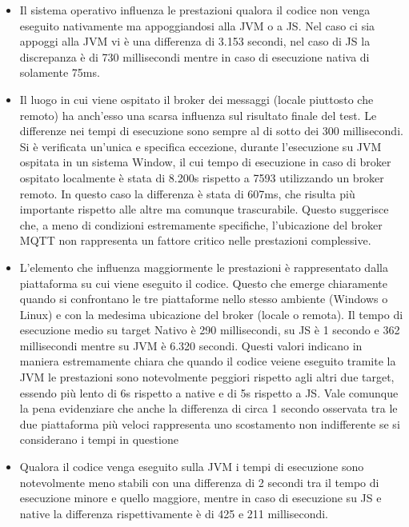 \documentclass[12pt,a4paper,openright,twoside]{book}
\begin{document}
\begin{itemize}
    \item Il sistema operativo influenza le prestazioni qualora il codice non venga eseguito nativamente ma appoggiandosi alla \ac{JVM} o a \ac{JS}. 
    Nel caso ci sia appoggi alla \ac{JVM} vi è una differenza di 3.153 secondi, nel caso di \ac{JS} la discrepanza è di 730 millisecondi 
    mentre in caso di esecuzione nativa di solamente 75ms.

    \item Il luogo in cui viene ospitato il broker dei messaggi (locale piuttosto che remoto) ha anch’esso una scarsa influenza sul risultato finale del test. 
    Le differenze nei tempi di esecuzione sono sempre al di sotto dei 300 millisecondi. Si è verificata un'unica e specifica eccezione, durante l'esecuzione su \ac{JVM}
    ospitata in un sistema Window, il cui tempo di esecuzione in caso di broker ospitato localmente è stata di 8.200s rispetto a 7593 utilizzando un broker remoto.
    In questo caso la differenza è stata di 607ms, che risulta più importante rispetto alle altre ma comunque trascurabile. 
    Questo suggerisce che, a meno di condizioni estremamente specifiche, l'ubicazione del broker \ac{MQTT} non rappresenta un fattore critico nelle prestazioni complessive.

    \item L’elemento che influenza maggiormente le prestazioni è rappresentato dalla piattaforma su cui viene eseguito il codice. Questo che emerge chiaramente quando si confrontano 
    le tre piattaforme nello stesso ambiente (Windows o Linux) e con la medesima ubicazione del broker (locale o remota). 
    Il tempo di esecuzione medio su target Nativo è 290 millisecondi, su \ac{JS} è 1 secondo e 362 millisecondi mentre su \ac{JVM} è 6.320 secondi.
    Questi valori indicano in maniera estremamente chiara che quando il codice veiene eseguito tramite la \ac{JVM} le prestazioni sono notevolmente 
    peggiori rispetto agli altri due target, essendo più lento di 6s rispetto a native e di 5s rispetto a \ac{JS}.
    Vale comunque la pena evidenziare che anche la differenza di circa 1 secondo osservata tra le due piattaforma più veloci 
    rappresenta uno scostamento non indifferente se si considerano i tempi in questione

    \item Qualora il codice venga eseguito sulla \ac{JVM} i tempi di esecuzione sono notevolmente meno stabili con una differenza di 2 secondi 
    tra il tempo di esecuzione minore e quello maggiore, mentre in caso di esecuzione su \ac{JS} e native la differenza rispettivamente è di 425 e 211 millisecondi.
\end{itemize}
\end{document}
